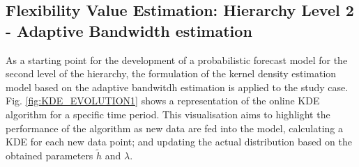 
\begin{table}[htbp]
\centering
\caption{Results of model evaluation procedure for the climatology model in the first level of the hierarchy, using the Brier Score (BS) as a performance score.}
\vspace*{3mm}
\label{tab:level1-scores}
\end{table}

\subsection{Flexibility Value Estimation: Hierarchy Level 2 - Adaptive Bandwidth estimation}\label{Sect:ResultsLevel2AdaptiveBandwidth}

As a starting point for the development of a probabilistic forecast model for the second level of the hierarchy, the formulation of the kernel density estimation model based on the adaptive bandwitdh estimation is applied to the study case.
Fig. \ref{fig:KDE_EVOLUTION1} shows a representation of the online KDE algorithm for a specific time period. This visualisation aims to highlight the performance of the algorithm as new data are fed into the model, calculating a KDE for each new data point; and updating the actual distribution based on the obtained parameters $\widetilde{h}$ and $\lambda$. 

